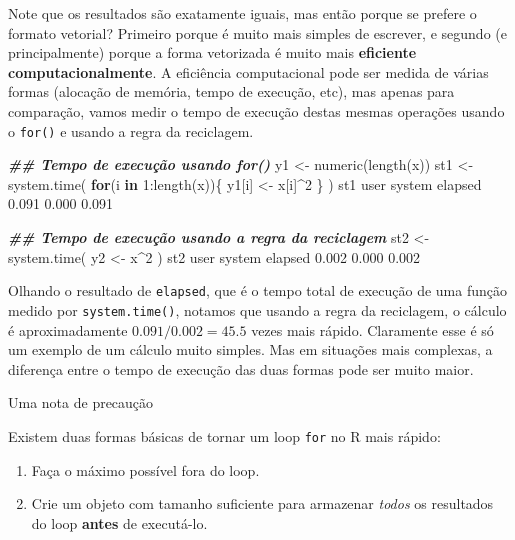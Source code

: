 \documentclass[
  10pt,
  a4paper]{book}
\newenvironment{Shaded}{\begin{snugshade}}{\end{snugshade}}
\newcommand{\ControlFlowTok}[1]{\textcolor[rgb]{0.13,0.29,0.53}{\textbf{#1}}}
\newcommand{\DecValTok}[1]{\textcolor[rgb]{0.00,0.00,0.81}{#1}}
\newcommand{\DocumentationTok}[1]{\textcolor[rgb]{0.56,0.35,0.01}{\textbf{\textit{#1}}}}
\newcommand{\FloatTok}[1]{\textcolor[rgb]{0.00,0.00,0.81}{#1}}
\newcommand{\FunctionTok}[1]{\textcolor[rgb]{0.00,0.00,0.00}{#1}}
\newcommand{\NormalTok}[1]{#1}
\newcommand{\OtherTok}[1]{\textcolor[rgb]{0.56,0.35,0.01}{#1}}
\newcommand{\SpecialCharTok}[1]{\textcolor[rgb]{0.00,0.00,0.00}{#1}}
\providecommand{\tightlist}{%
  \setlength{\itemsep}{0pt}\setlength{\parskip}{0pt}}
\begin{document}
Note que os resultados são exatamente iguais, mas então porque se
prefere o formato vetorial? Primeiro porque é muito mais simples de
escrever, e segundo (e principalmente) porque a forma vetorizada é
muito mais \textbf{eficiente computacionalmente}. A eficiência computacional
pode ser medida de várias formas (alocação de memória, tempo de
execução, etc), mas apenas para comparação, vamos medir o tempo de
execução destas mesmas operações usando o \texttt{for()} e usando a regra da
reciclagem.

\begin{Shaded}
\begin{Highlighting}[]
\DocumentationTok{\#\# Tempo de execução usando for()}
\NormalTok{y1 }\OtherTok{\textless{}{-}} \FunctionTok{numeric}\NormalTok{(}\FunctionTok{length}\NormalTok{(x))}
\NormalTok{st1 }\OtherTok{\textless{}{-}} \FunctionTok{system.time}\NormalTok{(}
    \ControlFlowTok{for}\NormalTok{(i }\ControlFlowTok{in} \DecValTok{1}\SpecialCharTok{:}\FunctionTok{length}\NormalTok{(x))\{}
\NormalTok{        y1[i] }\OtherTok{\textless{}{-}}\NormalTok{ x[i]}\SpecialCharTok{\^{}}\DecValTok{2}
\NormalTok{    \}}
\NormalTok{)}
\NormalTok{st1}
\NormalTok{   user  system elapsed }
  \FloatTok{0.091}   \FloatTok{0.000}   \FloatTok{0.091} 

\DocumentationTok{\#\# Tempo de execução usando a regra da reciclagem}
\NormalTok{st2 }\OtherTok{\textless{}{-}} \FunctionTok{system.time}\NormalTok{(}
\NormalTok{    y2 }\OtherTok{\textless{}{-}}\NormalTok{ x}\SpecialCharTok{\^{}}\DecValTok{2}
\NormalTok{)}
\NormalTok{st2}
\NormalTok{   user  system elapsed }
  \FloatTok{0.002}   \FloatTok{0.000}   \FloatTok{0.002} 
\end{Highlighting}
\end{Shaded}

Olhando o resultado de \texttt{elapsed}, que é o tempo total de execução de uma
função medido por \texttt{system.time()}, notamos que usando a regra da
reciclagem, o cálculo é aproximadamente
\(0.091/0.002 = 45.5\) vezes mais rápido.
Claramente esse é só um exemplo de um cálculo muito simples. Mas em
situações mais complexas, a diferença entre o tempo de execução das duas
formas pode ser muito maior.

Uma nota de precaução

Existem duas formas básicas de tornar um loop \texttt{for} no R mais rápido:

\begin{enumerate}
\def\labelenumi{\arabic{enumi}.}
\tightlist
\item
  Faça o máximo possível fora do loop.
\item
  Crie um objeto com tamanho suficiente para armazenar \emph{todos} os
  resultados do loop \textbf{antes} de executá-lo.
\end{enumerate}
\end{document}
